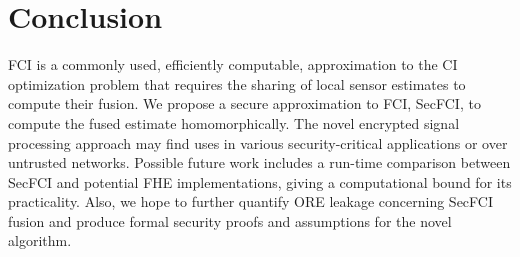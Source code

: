 \documentclass[letterpaper, 10 pt, conference]{ieeeconf}  %
\begin{document}



\section{Conclusion} \label{sec:conclusion}
FCI is a commonly used, efficiently computable, approximation to the CI optimization problem that requires the sharing of local sensor estimates to compute their fusion. We propose a secure approximation to FCI, SecFCI, to compute the fused estimate homomorphically. The novel encrypted signal processing approach may find uses in various security-critical applications or over untrusted networks. Possible future work includes a run-time comparison between SecFCI and potential FHE implementations, giving a computational bound for its practicality. Also, we hope to further quantify ORE leakage concerning SecFCI fusion and produce formal security proofs and assumptions for the novel algorithm.



\end{document}
